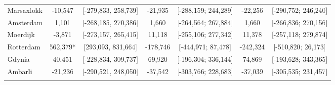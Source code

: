\begin{table}[ht]
\begin{adjustbox}{max width=\textwidth}
\begin{tabular}{lcccccc}
  Marsaxlokk & -10,547 & [-279,833, 258,739] &  -21,935 & [-288,159; 244,289] &  -22,256 & [-290,752; 246,240] \\ 
  Amsterdam &   1,101 & [-268,185, 270,386] &    1,660 & [-264,564; 267,884] &    1,660 & [-266,836; 270,156] \\ 
  Moerdijk &  -3,871 & [-273,157, 265,415] &   11,118 & [-255,106; 277,342] &   11,378 & [-257,118; 279,874] \\ 
  Rotterdam & 562,379* & [293,093, 831,664] & -178,746 & [-444,971; 87,478] & -242,324 & [-510,820; 26,173] \\ 
  Gdynia &  40,451 & [-228,834, 309,737] &   69,920 & [-196,304; 336,144] &   74,869 & [-193,628; 343,365] \\ 
  Ambarli & -21,236 & [-290,521, 248,050] &  -37,542 & [-303,766; 228,683] &  -37,039 & [-305,535; 231,457] \\ 
   [2ex] \hline \hline {}\end{tabular} 
 \end{adjustbox}
\endgroup
\end{table}
